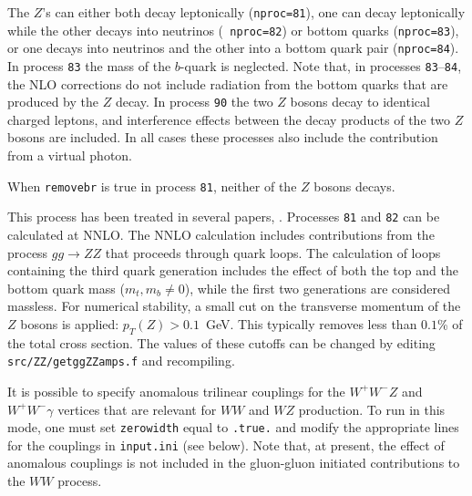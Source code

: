 
The $Z$'s can either both decay leptonically ({\tt nproc=81}), one can
decay leptonically while the other decays into neutrinos ({\tt
nproc=82}) or bottom quarks ({\tt nproc=83}), or one decays into
neutrinos and the other into a bottom quark pair ({\tt nproc=84}).  In
process {\tt 83} the mass of the $b$-quark is neglected. Note that, in
processes {\tt 83}--{\tt 84}, the NLO corrections do not include
radiation from the bottom quarks that are produced by the $Z$ decay.
In process {\tt 90} the two $Z$ bosons decay to identical charged
leptons, and interference effects between the decay products of the
two $Z$ bosons are included.  In all cases these processes also
include the contribution from a virtual photon.

When {\tt removebr} is true in process {\tt 81}, neither of the $Z$
bosons decays.

This process has been treated in several papers, 
\cite{Campbell:1999ah,Campbell:2011bn,Boughezal:2016wmq,Campbell:2022gdq}.
Processes {\tt 81} and {\tt 82} can be calculated at NNLO.
The NNLO calculation includes contributions from the process $gg \to ZZ$ 
that proceeds through quark loops. The calculation of loops
containing the third quark generation includes the effect of both the
top and the bottom quark mass ($m_t,m_b \neq 0$), while the first two
generations are considered massless. For numerical stability, a small
cut on the transverse momentum of the $Z$ bosons is applied:
$p_T(Z)>0.1$~GeV.  This typically removes less than $0.1$\% of the
total cross section. The values of these cutoffs can be changed by
editing {\tt src/ZZ/getggZZamps.f} and recompiling.


\label{sec:anomalous}
It is possible to specify anomalous trilinear
couplings for the $W^+W^-Z$ and $W^+W^-\gamma$ vertices that are
relevant for $WW$ and $WZ$ production. To run in this mode, one must
set {\tt zerowidth} equal to {\tt .true.}  and modify the appropriate
lines for the couplings in {\tt input.ini} (see below). Note that, at
present, the effect of anomalous couplings is not included in the
gluon-gluon initiated contributions to the $WW$ process.

